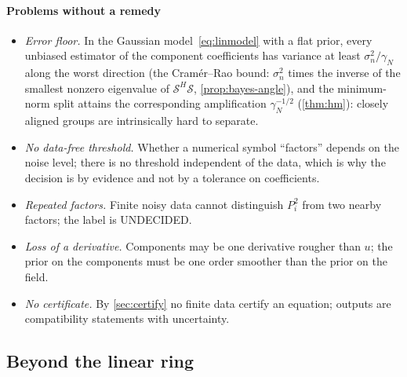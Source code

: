 \documentclass[11pt]{article}
\theoremstyle{plain}
\theoremstyle{definition}
\theoremstyle{remark}
\newcommand{\sumop}{\mathcal{S}}            %
\newcommand{\gN}{\gamma_{N}}                %
\newcommand{\noise}{\sigma_{n}}             %
\newcommand{\lab}[1]{\textsf{#1}}           %
\newcommand{\UND}{\lab{UNDECIDED}}
\begin{document}
\paragraph{Problems without a remedy}
\begin{itemize}
  \item \emph{Error floor.} In the Gaussian model~\eqref{eq:linmodel} with a flat prior, every unbiased estimator of the
  component coefficients has variance at least $\noise^2/\gN$ along the worst direction (the Cram\'er--Rao bound: $\noise^2$ times the
  inverse of the smallest nonzero eigenvalue of $\sumop^H\sumop$, \cref{prop:bayes-angle}), and the minimum-norm split attains
  the corresponding amplification $\gN^{-1/2}$ (\cref{thm:hm}):
  closely aligned groups are intrinsically hard to separate.
  \item \emph{No data-free threshold.} Whether a numerical symbol ``factors'' depends on the noise level;
  there is no threshold independent of the data, which is why the decision is by evidence and not by a
  tolerance on coefficients.
  \item \emph{Repeated factors.} Finite noisy data cannot distinguish $P_i^2$ from two nearby factors;
  the label is \UND.
  \item \emph{Loss of a derivative.} Components may be one derivative rougher than $u$; the prior on the
  components must be one order smoother than the prior on the field.
  \item \emph{No certificate.} By \cref{sec:certify} no finite data certify an equation; outputs are
  compatibility statements with uncertainty.
\end{itemize}



\subsection{Beyond the linear ring}\label{sec:beyond}\label{sec:nonlinear}
\end{document}
